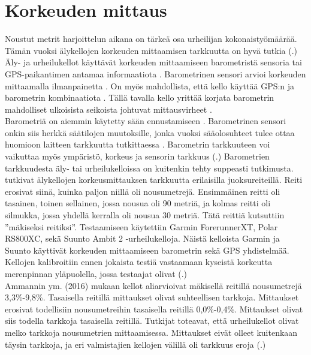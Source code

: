 \documentclass[utf8,bachelor,finnish]{bachelor}
\begin{document}
  \section{Korkeuden mittaus}
    Noustut metrit harjoittelun aikana on tärkeä osa urheilijan kokonaistyömäärää. Tämän vuoksi älykellojen korkeuden mittaamisen tarkkuutta on hyvä tutkia (\cite{ammann_accuracy_2016}.)
     Äly- ja urheilukellot käyttävät korkeuden mittaamiseen barometristä sensoria tai GPS-paikantimen antamaa informaatiota \parencite{ammann_accuracy_2016}.
      Barometrinen sensori arvioi korkeuden mittaamalla ilmanpainetta \parencite{aroganam2019review}.
       On myös mahdollista, että kello käyttää GPS:n ja barometrin kombinaatiota \parencite{aroganam2019review}. Tällä tavalla kello yrittää korjata barometrin mahdolliset ulkoisista seikoista
        johtuvat mittausvirheet \parencite{aroganam2019review}.\\
        
        Barometriä on aiemmin käytetty sään ennustamiseen \parencite{manivannan_challenges_2020}.
         Barometrinen sensori onkin siis herkkä säätilojen muutoksille, jonka vuoksi sääolosuhteet tulee ottaa huomioon laitteen tarkkuutta tutkittaessa \parencite{manivannan_challenges_2020, ammann_accuracy_2016}.
          Barometrin tarkkuuteen voi vaikuttaa myös ympäristö, korkeus ja sensorin tarkkuus (\cite{manivannan_challenges_2020}.)
           Barometrien tarkkuudesta äly- tai urheilukelloissa on kuitenkin tehty suppeasti tutkimusta.\\
           
    \textcite{ammann_accuracy_2016} tutkivat älykellojen korkeusmittauksen tarkkuutta erilaisilla juoksureiteillä. Reiti erosivat siinä, kuinka paljon niillä oli nousumetrejä.
     Ensimmäinen reitti oli tasainen, toinen sellainen, jossa nousua oli 90 metriä, ja kolmas reitti oli silmukka, jossa yhdellä kerralla oli nousua 30 metriä.
      Tätä reittiä kutsuttiin ''mäkiseksi reitiksi''.
       Testaamiseen käytettiin Garmin ForerunnerXT, Polar RS800XC, sekä Suunto Ambit 2 -urheilukelloja. Näistä kelloista Garmin ja
        Suunto käyttivät korkeuden mittaamiseen barometrin sekä GPS yhdistelmää.
         Kellojen kalibroitiin ennen jokaista testiä vastaamaan kyseistä korkeutta merenpinnan yläpuolella, jossa testaajat olivat (\cite{ammann_accuracy_2016}.)\\

    Ammannin ym. (2016) mukaan kellot aliarvioivat mäkisellä reitillä nousumetrejä 3,3\%-9,8\%. Tasaisella reitillä mittaukset olivat suhteellisen tarkkoja.
     Mittaukset erosivat todellisiin nousumetreihin tasaisella reitillä 0,0\%-0,4\%. Mittaukset olivat siis todella tarkkoja tasaisella reitillä.
      Tutkijat toteavat, että urheilukellot olivat melko tarkkoja nousumetrien mittaamisessa. Mittaukset eivät olleet kuitenkaan
       täysin tarkkoja, ja eri valmistajien kellojen välillä oli tarkkuus eroja (\cite{ammann_accuracy_2016}.)\\
       
\end{document}
